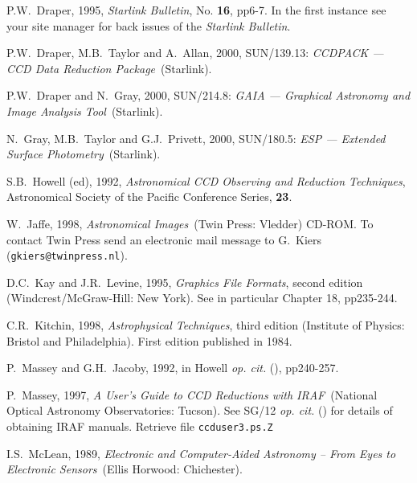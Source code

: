 \documentclass[twoside,11pt]{article}
\newcommand{\htmladdnormallink}[2]{#1}
\newcommand{\xref}[3]{#1}
\begin{document}
\begin{thebibliography}{99}
   P.W.~Draper, 1995, 
  \htmladdnormallink{{\it Starlink Bulletin}}
   {http://star-www.rl.ac.uk//bulletin.html},
   No. {\bf 16}, pp6-7.  In the first instance see your site manager
   for back issues of the {\it Starlink Bulletin}.

   P.W.~Draper, M.B.~Taylor and A.~Allan, 2000,
   \xref{SUN/139.13}{sun139}{}: {\it CCDPACK --- CCD Data Reduction
   Package}\, (Starlink).

   P.W.~Draper and N.~Gray, 2000,
   \xref{SUN/214.8}{sun214}{}: {\it GAIA --- Graphical Astronomy and Image
   Analysis Tool}\, (Starlink).

   N.~Gray, M.B.~Taylor and G.J.~Privett, 2000,
   \xref{SUN/180.5}{sun180}{}: {\it ESP --- Extended Surface Photometry}\,
   (Starlink).

   S.B.~Howell (ed), 1992, {\it Astronomical CCD
   Observing and Reduction Techniques}, Astronomical Society of the
   Pacific Conference Series, {\bf 23}.

   W.~Jaffe, 1998, {\it Astronomical Images}\,
   (Twin Press: Vledder) CD-ROM.  To contact Twin Press send an electronic
   mail message to G.~Kiers ({\tt gkiers@twinpress.nl}).

   D.C.~Kay and J.R.~Levine, 1995, {\it Graphics File
   Formats}, second edition
  \newline (Windcrest/McGraw-Hill: New York).  See in particular
   Chapter 18, pp235-244.

   C.R.~Kitchin, 1998, {\it Astrophysical Techniques},
   third edition (Institute of Physics: Bristol and Philadelphia).
   First edition published in 1984.

   P.~Massey and G.H.~Jacoby, 1992, in Howell
   {\it op. cit.}\/ (\cite{HOWELL92}), pp240-257.

   P.~Massey, 1997, {\it A User's Guide to CCD
   Reductions with IRAF}\, (National Optical Astronomy Observatories:
   Tucson).  See \xref{SG/12}{sg12}{} {\it op. cit.}\/ (\cite{SG12}) for
   details of obtaining IRAF manuals.  Retrieve file {\tt ccduser3.ps.Z}

   I.S.~McLean, 1989, {\it Electronic and Computer-Aided
   Astronomy -- From Eyes to Electronic Sensors}\, (Ellis Horwood:
   Chichester).


\end{thebibliography}
\end{document}
